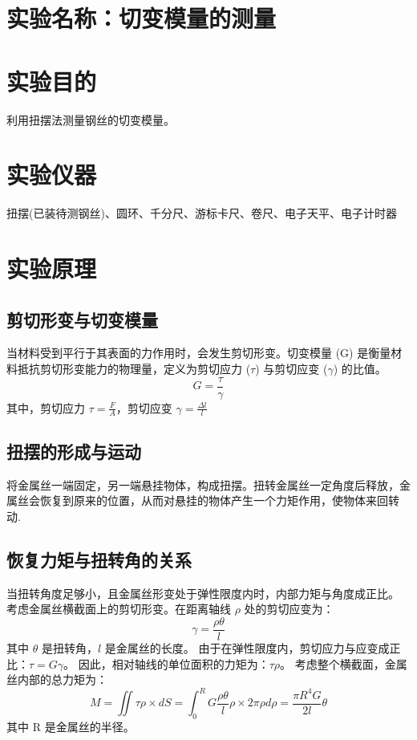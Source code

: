 \documentclass[12pt,a4paper]{article}
\begin{document}
	
	\section{实验名称：切变模量的测量}
	
	\section{实验目的}
		利用扭摆法测量钢丝的切变模量。

	\section{实验仪器}
		扭摆(已装待测钢丝)、圆环、千分尺、游标卡尺、卷尺、电子天平、电子计时器

	\section{实验原理}
	\subsection{剪切形变与切变模量}

	当材料受到平行于其表面的力作用时，会发生剪切形变。切变模量 (G) 是衡量材料抵抗剪切形变能力的物理量，定义为剪切应力 ($\tau$) 与剪切应变 ($\gamma$) 的比值。
	\begin{equation}
    G = \frac{\tau}{\gamma}
	\end{equation}
	其中，剪切应力 $\tau = \frac{F}{A}$，剪切应变 $\gamma = \frac{\Delta l}{l}$

	\subsection{扭摆的形成与运动}
	将金属丝一端固定，另一端悬挂物体，构成扭摆。扭转金属丝一定角度后释放，金属丝会恢复到原来的位置，从而对悬挂的物体产生一个力矩作用，使物体来回转动.

	\subsection{恢复力矩与扭转角的关系}
	当扭转角度足够小，且金属丝形变处于弹性限度内时，内部力矩与角度成正比。
	考虑金属丝横截面上的剪切形变。在距离轴线 $\rho$ 处的剪切应变为：
	\begin{equation}
    \gamma = \frac{\rho\theta}{l}
	\end{equation}
	其中 $\theta$ 是扭转角，$l$ 是金属丝的长度。
	由于在弹性限度内，剪切应力与应变成正比：$\tau = G\gamma$。
	因此，相对轴线的单位面积的力矩为：$\tau\rho$。
	考虑整个横截面，金属丝内部的总力矩为：
	\begin{equation}
    M = \iint \tau\rho \times dS = \int_{0}^{R} G\frac{\rho\theta}{l} \rho \times 2\pi\rho d\rho = \frac{\pi R^4 G}{2l}\theta
	\end{equation}
	其中 R 是金属丝的半径。
\end{document}
